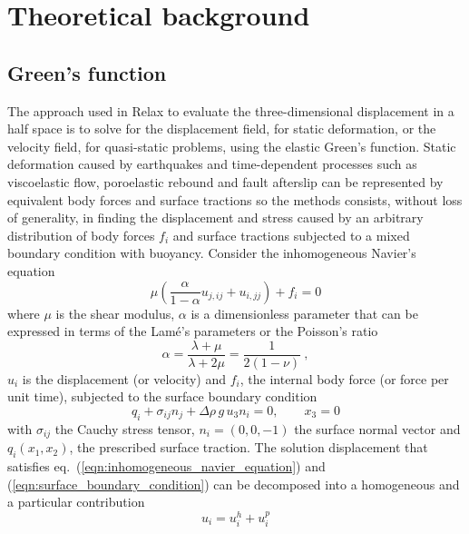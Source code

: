 \documentclass[10pt]{article}
\begin{document}
\pagebreak

\tableofcontents

\pagebreak

\section{Theoretical background}

\subsection{Green's function}
The approach used in Relax to evaluate the three-dimensional displacement in a half space is to solve for the displacement field, for static deformation, or the velocity field, for quasi-static problems, using the elastic Green's function. Static deformation caused by earthquakes and time-dependent processes such as viscoelastic flow, poroelastic rebound and fault afterslip can be represented by equivalent body forces and surface tractions so the methods consists, without loss of generality, in finding the displacement and stress caused by an arbitrary distribution of body forces $f_i$ and surface tractions subjected to a mixed boundary condition with buoyancy. Consider the inhomogeneous Navier's equation
%
\begin{equation}\label{eqn:inhomogeneous_navier_equation}
\mu\left(\frac{\alpha}{1-\alpha}u_{j,ij}+u_{i,jj}\right)+f_i=0
\end{equation}
%
where $\mu$ is the shear modulus, $\alpha$ is a dimensionless parameter that can be expressed in terms of the Lam\'{e}'s parameters or the Poisson's ratio
\begin{equation}
\alpha=\frac{\lambda+\mu}{\lambda+2\mu}=\frac{1}{2(1-\nu)}~,
\end{equation}
$u_i$ is the displacement (or velocity) and $f_i$, the internal body force (or force per unit time), subjected to the surface boundary condition
%
\begin{equation}\label{eqn:surface_boundary_condition}
q_i+\sigma_{ij}n_j+\Delta\rho\,g\,u_3 n_i=0,\qquad x_3=0
\end{equation}
%
with $\sigma_{ij}$ the Cauchy stress tensor, $n_i=(0,0,-1)$ the surface normal vector and $q_i(x_1,x_2)$, the prescribed surface traction. The solution displacement that satisfies eq.~(\ref{eqn:inhomogeneous_navier_equation}) and (\ref{eqn:surface_boundary_condition}) can be decomposed into a homogeneous and a particular contribution
\begin{equation}\label{eqn:decomposition_particular_general}
u_i=u_i^h+u_i^p
\end{equation}
\end{document}
